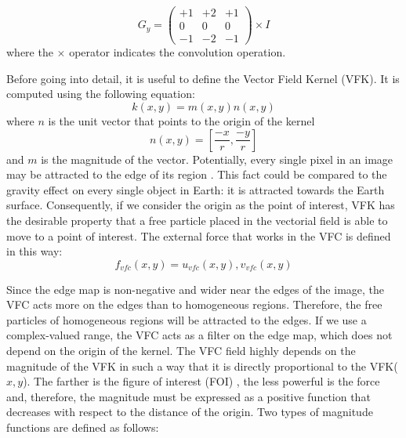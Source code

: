 \documentclass[final,a4paper,12pt,english]{UnicaPhdThesis3}
\begin{document}
\medskip 

\begin{equation}
G_{y} = \begin{pmatrix}
+1 & +2 & +1 \\
0 & 0 & 0 \\
-1 & -2 & -1 \end{pmatrix} \times I
\end{equation}
where the $\times$ operator indicates the convolution operation.

Before going into detail, it is useful to define the Vector Field Kernel (VFK). It is computed using the following equation:
\begin{equation}
k ( x,y ) =m(x,y)n(x,y)
\end{equation}
where $n$ is the unit vector that points to the origin of the kernel	
\begin{equation}
n ( x,y ) = [\frac{-x}{r} , \frac{-y}{r} ]
\end{equation}
and $m$ is the magnitude of the vector. Potentially, every single pixel in an image may be attracted to the edge of its region \cite{Bing}. This fact could be compared to the gravity effect on every single object in Earth: it is attracted towards the Earth surface. Consequently, if we consider the origin as the point of interest, VFK has the desirable property that a free particle placed in the vectorial field is able to move to a point of interest. The external force that works in the VFC is defined in this way:
\begin{equation}
{f} _{vfc} ( x,y ) = {u} _{vfc} ( x,y ) , {v} _{vfc} (x,y)
\end{equation}

Since the edge map is non-negative and wider near the edges of the image, the VFC acts more on the edges than to homogeneous regions. Therefore, the free particles of homogeneous regions will be attracted to the edges. If we use a complex-valued range, the VFC acts as a filter on the edge map, which does not depend on the origin of the kernel. The VFC field highly depends on the magnitude of the VFK in such a way that it is directly proportional to the VFK($x, y$). 
The farther is the figure of interest (FOI) \cite{Bing}, the less powerful is the force and, therefore, the magnitude must be expressed as a positive function that decreases with respect to the distance of the origin. Two types of magnitude functions are defined as follows:
\end{document}
